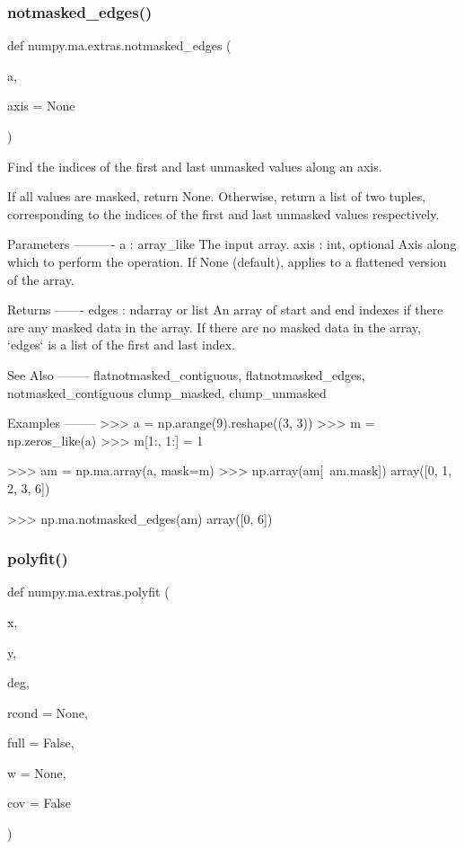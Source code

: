 \subsubsection{\texorpdfstring{notmasked\+\_\+edges()}{notmasked\_edges()}}
{\footnotesize\ttfamily def numpy.\+ma.\+extras.\+notmasked\+\_\+edges (\begin{DoxyParamCaption}\item[{}]{a,  }\item[{}]{axis = {\ttfamily None} }\end{DoxyParamCaption})}

\begin{DoxyVerb}Find the indices of the first and last unmasked values along an axis.

If all values are masked, return None.  Otherwise, return a list
of two tuples, corresponding to the indices of the first and last
unmasked values respectively.

Parameters
----------
a : array_like
    The input array.
axis : int, optional
    Axis along which to perform the operation.
    If None (default), applies to a flattened version of the array.

Returns
-------
edges : ndarray or list
    An array of start and end indexes if there are any masked data in
    the array. If there are no masked data in the array, `edges` is a
    list of the first and last index.

See Also
--------
flatnotmasked_contiguous, flatnotmasked_edges, notmasked_contiguous
clump_masked, clump_unmasked

Examples
--------
>>> a = np.arange(9).reshape((3, 3))
>>> m = np.zeros_like(a)
>>> m[1:, 1:] = 1

>>> am = np.ma.array(a, mask=m)
>>> np.array(am[~am.mask])
array([0, 1, 2, 3, 6])

>>> np.ma.notmasked_edges(am)
array([0, 6])\end{DoxyVerb}
 \mbox{\label{namespacenumpy_1_1ma_1_1extras_ae842a548a3c426def8ede2e254b79152}} 
\subsubsection{\texorpdfstring{polyfit()}{polyfit()}}
{\footnotesize\ttfamily def numpy.\+ma.\+extras.\+polyfit (\begin{DoxyParamCaption}\item[{}]{x,  }\item[{}]{y,  }\item[{}]{deg,  }\item[{}]{rcond = {\ttfamily None},  }\item[{}]{full = {\ttfamily False},  }\item[{}]{w = {\ttfamily None},  }\item[{}]{cov = {\ttfamily False} }\end{DoxyParamCaption})}

